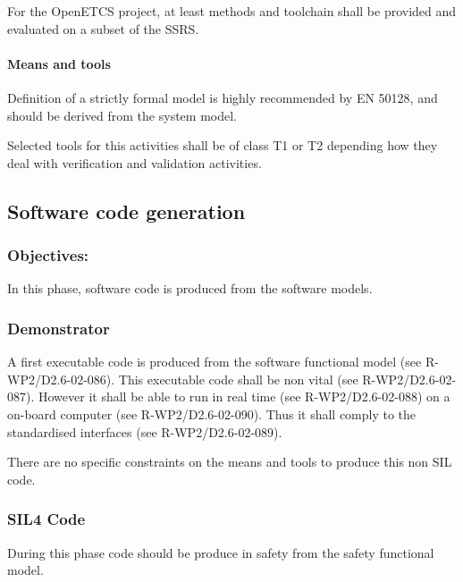 For the OpenETCS project, at least methods and toolchain shall be provided and evaluated on a subset of the SSRS.

\paragraph{Means and tools}
\label{sec:sw-means}

Definition of a strictly formal  model is highly recommended by EN 50128, and should be derived from  the system  model.


Selected tools for this activities shall  be of class T1 or T2  depending how they deal  with verification and validation activities.


\subsection{Software code generation}
\label{sec:sw-code}



\subsubsection{Objectives:}
\label{sec:sw-req-objective}


In this phase, software code is produced from the software models.

\subsubsection{Demonstrator}
\label{sec:demo-phase}

A first executable code is produced from the software functional model (see R-WP2/D2.6-02-086). This executable code shall be non vital (see R-WP2/D2.6-02-087). However it shall be able to run in real time (see R-WP2/D2.6-02-088) on a on-board computer (see R-WP2/D2.6-02-090).
Thus it shall comply to the standardised interfaces (see R-WP2/D2.6-02-089). 

There are no specific constraints on the means and tools to  produce this non SIL code.


\subsubsection{SIL4 Code}
\label{sec:code-phase}

During this phase code should be produce in safety from the safety functional model.

